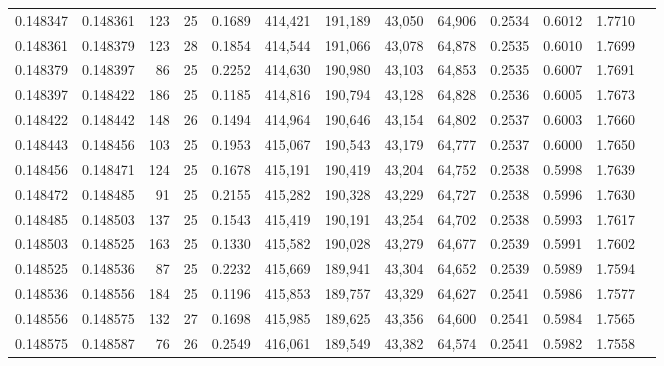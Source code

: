 \begin{tabular}{rrrrrrrrrrrrr}
0.148347 & 0.148361 &   123 &  25 &                                     0.1689 & 414,421 & 191,189 &  43,050 &  64,906 & 0.2534 & 0.6012 & 1.7710 \\
0.148361 & 0.148379 &   123 &  28 &                                     0.1854 & 414,544 & 191,066 &  43,078 &  64,878 & 0.2535 & 0.6010 & 1.7699 \\
0.148379 & 0.148397 &    86 &  25 &                                     0.2252 & 414,630 & 190,980 &  43,103 &  64,853 & 0.2535 & 0.6007 & 1.7691 \\
0.148397 & 0.148422 &   186 &  25 &                                     0.1185 & 414,816 & 190,794 &  43,128 &  64,828 & 0.2536 & 0.6005 & 1.7673 \\
0.148422 & 0.148442 &   148 &  26 &                                     0.1494 & 414,964 & 190,646 &  43,154 &  64,802 & 0.2537 & 0.6003 & 1.7660 \\
0.148443 & 0.148456 &   103 &  25 &                                     0.1953 & 415,067 & 190,543 &  43,179 &  64,777 & 0.2537 & 0.6000 & 1.7650 \\
0.148456 & 0.148471 &   124 &  25 &                                     0.1678 & 415,191 & 190,419 &  43,204 &  64,752 & 0.2538 & 0.5998 & 1.7639 \\
0.148472 & 0.148485 &    91 &  25 &                                     0.2155 & 415,282 & 190,328 &  43,229 &  64,727 & 0.2538 & 0.5996 & 1.7630 \\
0.148485 & 0.148503 &   137 &  25 &                                     0.1543 & 415,419 & 190,191 &  43,254 &  64,702 & 0.2538 & 0.5993 & 1.7617 \\
0.148503 & 0.148525 &   163 &  25 &                                     0.1330 & 415,582 & 190,028 &  43,279 &  64,677 & 0.2539 & 0.5991 & 1.7602 \\
0.148525 & 0.148536 &    87 &  25 &                                     0.2232 & 415,669 & 189,941 &  43,304 &  64,652 & 0.2539 & 0.5989 & 1.7594 \\
0.148536 & 0.148556 &   184 &  25 &                                     0.1196 & 415,853 & 189,757 &  43,329 &  64,627 & 0.2541 & 0.5986 & 1.7577 \\
0.148556 & 0.148575 &   132 &  27 &                                     0.1698 & 415,985 & 189,625 &  43,356 &  64,600 & 0.2541 & 0.5984 & 1.7565 \\
0.148575 & 0.148587 &    76 &  26 &                                     0.2549 & 416,061 & 189,549 &  43,382 &  64,574 & 0.2541 & 0.5982 & 1.7558 \\

\end{tabular}
